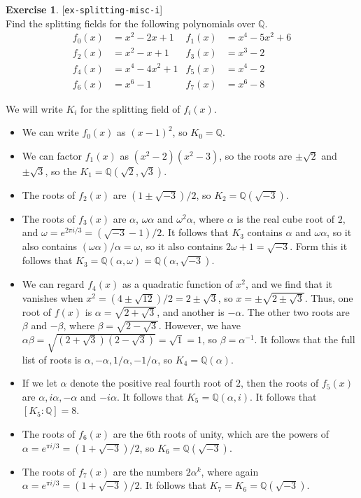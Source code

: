 \documentclass{amsart}
\newcommand{\Q}         {{\mathbb{Q}}}
\newcommand{\al}        {\alpha}
\newcommand{\bt}        {\beta}
\newcommand{\om}        {\omega}
\renewcommand{\:}{\colon}
\newcommand{\lastexlabel}{}
\newcommand{\exlabel}[1]{
 \global\def\lastexlabel{#1}\label{#1}[\texttt{#1}]\ \\
}
\newcommand{\exlabel}[1]{
 \global\def\lastexlabel{#1}\label{#1}
}
\newenvironment{solution}{\SolutionInline}{\endSolutionInline}
\theoremstyle{definition}
\newtheorem{exercise}{Exercise}[section]
\renewenvironment{solution}{\SolutionAtEnd}{\endSolutionAtEnd}
\begin{document}
\begin{exercise}\exlabel{ex-splitting-misc-i}
 Find the splitting fields for the following polynomials over $\Q$.
 \begin{align*}
  f_0(x) &= x^2-2x+1                &
  f_1(x) &= x^4-5x^2+6              \\
  f_2(x) &= x^2-x+1                 &
  f_3(x) &= x^3-2                   \\
  f_4(x) &= x^4-4x^2+1              &
  f_5(x) &= x^4-2                   \\
  f_6(x) &= x^6-1                   &
  f_7(x) &= x^6-8                   
 \end{align*}
\end{exercise}
\begin{solution}
 We will write $K_i$ for the splitting field of $f_i(x)$.
 \begin{itemize}
  \item We can write $f_0(x)$ as $(x-1)^2$, so $K_0=\Q$.
  \item We can factor $f_1(x)$ as $(x^2-2)(x^2-3)$, so the roots are
   $\pm\sqrt{2}$ and $\pm\sqrt{3}$, so the
   $K_1=\Q(\sqrt{2},\sqrt{3})$. 
  \item The roots of $f_2(x)$ are $(1\pm\sqrt{-3})/2$, so
   $K_2=\Q(\sqrt{-3})$.
  \item The roots of $f_3(x)$ are $\al$, $\om\al$ and $\om^2\al$,
   where $\al$ is the real cube root of $2$, and
   $\om=e^{2\pi i/3}=(\sqrt{-3}-1)/2$.  It follows that $K_3$ contains
   $\al$ and $\om\al$, so it also contains $(\om\al)/\al=\om$, so it
   also contains $2\om+1=\sqrt{-3}$.  Form this it follows that
   $K_3=\Q(\al,\om)=\Q(\al,\sqrt{-3})$. 
  \item We can regard $f_4(x)$ as a quadratic function of $x^2$, and
   we find that it vanishes when $x^2=(4\pm\sqrt{12})/2=2\pm\sqrt{3}$,
   so $x=\pm\sqrt{2\pm\sqrt{3}}$.  Thus, one root of $f(x)$ is
   $\al=\sqrt{2+\sqrt{3}}$, and another is $-\al$.  The other two
   roots are $\bt$ and $-\bt$, where $\bt=\sqrt{2-\sqrt{3}}$.
   However, we have
   $\al\bt=\sqrt{(2+\sqrt{3})(2-\sqrt{3})}=\sqrt{1}=1$, so
   $\bt=\al^{-1}$.  It follows that the full list of roots is
   $\al,-\al,1/\al,-1/\al$, so $K_4=\Q(\al)$.
  \item If we let $\al$ denote the positive real fourth root of $2$,
   then the roots of $f_5(x)$ are $\al,i\al,-\al$ and $-i\al$.  It
   follows that $K_5=\Q(\al,i)$.  It follows that $[K_5:\Q]=8$.
  \item The roots of $f_6(x)$ are the $6$th roots of unity, which are
   the powers of $\al=e^{\pi i/3}=(1+\sqrt{-3})/2$, so
   $K_6=\Q(\sqrt{-3})$.
  \item The roots of $f_7(x)$ are the numbers $2\al^k$, where again
   $\al=e^{\pi i/3}=(1+\sqrt{-3})/2$.  It follows that
   $K_7=K_6=\Q(\sqrt{-3})$.
 \end{itemize}
\end{solution}
\end{document}
